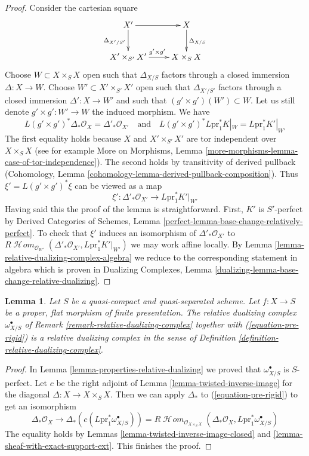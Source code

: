 \documentclass{stacks-project}
\theoremstyle{plain}
\newtheorem{lemma}[subsection]{Lemma}
\theoremstyle{definition}
\theoremstyle{remark}
\numberwithin{equation}{subsection}
\def\SheafHom{\mathop{\mathcal{H}\!\mathit{om}}\nolimits}
\begin{document}
\begin{proof}
Consider the cartesian square
$$
\xymatrix{
X' \ar[d]_{\Delta_{X'/S'}} \ar[r] & X \ar[d]^{\Delta_{X/S}} \\
X' \times_{S'} X' \ar[r]^{g' \times g'} & X \times_S X
}
$$
Choose $W \subset X \times_S X$ open such that $\Delta_{X/S}$
factors through a closed immersion $\Delta : X \to W$.
Choose $W' \subset X' \times_{S'} X'$ open such that $\Delta_{X'/S'}$
factors through a closed immersion $\Delta' : X \to W'$
and such that $(g' \times g')(W') \subset W$. Let us still denote
$g' \times g' : W' \to W$ the induced morphism. We have
$$
L(g' \times g')^*\Delta_*\mathcal{O}_X =
\Delta'_*\mathcal{O}_{X'}
\quad\text{and}\quad
L(g' \times g')^*L\text{pr}_1^*K|_W =
L\text{pr}_1^*K'|_{W'}
$$
The first equality holds because $X$ and $X' \times_{S'} X'$
are tor independent over $X \times_S X$ (see for example
More on Morphisms, Lemma \ref{more-morphisms-lemma-case-of-tor-independence}).
The second holds by transitivity of derived pullback
(Cohomology, Lemma \ref{cohomology-lemma-derived-pullback-composition}).
Thus $\xi' = L(g' \times g')^*\xi$ can be viewed as a map
$$
\xi' : \Delta'_*\mathcal{O}_{X'} \longrightarrow L\text{pr}_1^*K'|_{W'}
$$
Having said this the proof of the lemma is straightforward.
First, $K'$ is $S'$-perfect by Derived Categories of Schemes, Lemma
\ref{perfect-lemma-base-change-relatively-perfect}.
To check that $\xi'$ induces an isomorphism
of $\Delta'_*\mathcal{O}_{X'}$ to
$R\SheafHom_{\mathcal{O}_{W'}}(
\Delta'_*\mathcal{O}_{X'}, L\text{pr}_1^*K'|_{W'})$
we may work affine locally. By
Lemma \ref{lemma-relative-dualizing-complex-algebra}
we reduce to the corresponding statement in algebra
which is proven in Dualizing Complexes, Lemma
\ref{dualizing-lemma-base-change-relative-dualizing}.
\end{proof}

\begin{lemma}
\label{lemma-flat-proper-relative-dualizing}
Let $S$ be a quasi-compact and quasi-separated scheme.
Let $f : X \to S$ be a proper, flat morphism of finite presentation.
The relative dualizing complex $\omega_{X/S}^\bullet$ of
Remark \ref{remark-relative-dualizing-complex}
together with (\ref{equation-pre-rigid}) is a relative
dualizing complex in the sense of
Definition \ref{definition-relative-dualizing-complex}.
\end{lemma}

\begin{proof}
In Lemma \ref{lemma-properties-relative-dualizing} we proved that
$\omega_{X/S}^\bullet$ is $S$-perfect.
Let $c$ be the right adjoint of
Lemma \ref{lemma-twisted-inverse-image}
for the diagonal $\Delta : X \to X \times_S X$.
Then we can apply $\Delta_*$ to (\ref{equation-pre-rigid})
to get an isomorphism
$$
\Delta_*\mathcal{O}_X \to
\Delta_*(c(L\text{pr}_1^*\omega_{X/S}^\bullet)) =
R\SheafHom_{\mathcal{O}_{X \times_S X}}(
\Delta_*\mathcal{O}_X, L\text{pr}_1^*\omega_{X/S}^\bullet)
$$
The equality holds by
Lemmas \ref{lemma-twisted-inverse-image-closed} and
\ref{lemma-sheaf-with-exact-support-ext}.
This finishes the proof.
\end{proof}
\end{document}
